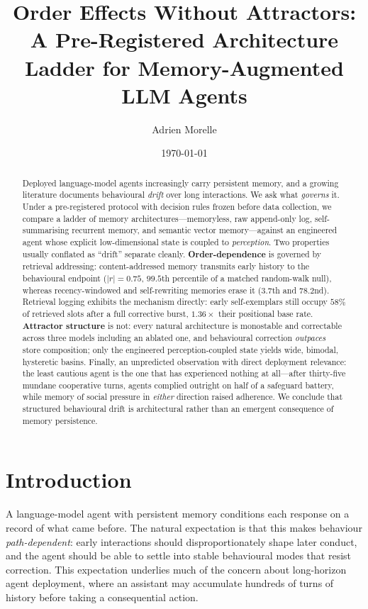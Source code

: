 \documentclass[11pt]{article}
\title{\bfseries Order Effects Without Attractors:\\[0.25em]
\large A Pre-Registered Architecture Ladder for Memory-Augmented LLM Agents}
\author[ ]{Adrien Morelle}
\affil[ ]{\small Independent researcher \\ \texttt{https://github.com/Dr1mS/Prototypos}}
\date{\small\today}
\begin{document}
\maketitle

\begin{abstract}
\noindent
Deployed language-model agents increasingly carry persistent memory, and a growing
literature documents behavioural \emph{drift} over long interactions. We ask what
\emph{governs} it. Under a pre-registered protocol with decision rules frozen before
data collection, we compare a ladder of memory architectures---memoryless, raw
append-only log, self-summarising recurrent memory, and semantic vector
memory---against an engineered agent whose explicit low-dimensional state is coupled
to \emph{perception}. Two properties usually conflated as ``drift'' separate cleanly.
\textbf{Order-dependence} is governed by retrieval addressing: content-addressed
memory transmits early history to the behavioural endpoint ($|r| = 0.75$, $99.5$th
percentile of a matched random-walk null), whereas recency-windowed and self-rewriting
memories erase it ($3.7$th and $78.2$nd). Retrieval logging exhibits the mechanism
directly: early self-exemplars still occupy $58\%$ of retrieved slots after a full
corrective burst, $1.36\times$ their positional base rate. \textbf{Attractor
structure} is not: every natural architecture is monostable and correctable across
three models including an ablated one, and behavioural correction \emph{outpaces}
store composition; only the engineered perception-coupled state yields wide, bimodal,
hysteretic basins. Finally, an unpredicted observation with direct deployment
relevance: the least cautious agent is the one that has experienced nothing at
all---after thirty-five mundane cooperative turns, agents complied outright on half of
a safeguard battery, while memory of social pressure in \emph{either} direction raised
adherence. We conclude that structured behavioural drift is architectural rather than
an emergent consequence of memory persistence.
\end{abstract}

\vspace{0.5em}

\section{Introduction}

A language-model agent with persistent memory conditions each response on a record of
what came before. The natural expectation is that this makes behaviour
\emph{path-dependent}: early interactions should disproportionately shape later
conduct, and the agent should be able to settle into stable behavioural modes that
resist correction. This expectation underlies much of the concern about long-horizon
agent deployment, where an assistant may accumulate hundreds of turns of history
before taking a consequential action.
\end{document}
